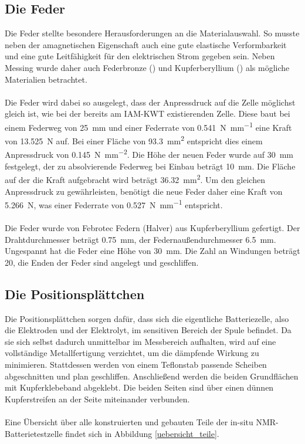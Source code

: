 \documentclass[a4paper, 11pt, headsepline,footsepline,twoside,abstract]{scrbook}
\begin{document}
\subsection{Die Feder}
Die Feder stellte besondere Herausforderungen an die Materialauswahl. So musste neben der amagnetischen Eigenschaft auch eine gute elastische Verformbarkeit und eine gute Leitfähigkeit für den elektrischen Strom gegeben sein. Neben Messing wurde daher auch Federbronze () und Kupferberyllium () als mögliche Materialien betrachtet.
\\\\
Die Feder wird dabei so ausgelegt, dass der Anpressdruck auf die Zelle möglichst gleich ist, wie bei der bereits am IAM-KWT existierenden Zelle. Diese baut bei einem Federweg von \SI{25}{\milli\metre} und einer Federrate von \SI{0.541}{\newton\per\milli\metre} eine Kraft von \SI{13.525}{\newton} auf. Bei einer Fläche von \SI{93.3}{\square\milli\metre} entspricht dies einem Anpressdruck von \SI{0.145}{\newton\per\square\milli\metre}. Die Höhe der neuen Feder wurde auf \SI{30}{\milli\metre} festgelegt, der zu absolvierende Federweg bei Einbau beträgt \SI{10}{\milli\metre}. Die Fläche auf der die Kraft aufgebracht wird beträgt \SI{36.32}{\square\milli\metre}. Um den gleichen Anpressdruck zu gewährleisten, benötigt die neue Feder daher eine Kraft von \SI{5.266}{\newton}, was einer Federrate von \SI{0.527}{\newton\per\milli\metre} entspricht.
\\\\
Die Feder wurde von Febrotec Federn (Halver) aus Kupferberyllium gefertigt. Der Drahtdurchmesser beträgt \SI{0.75}{\milli\metre}, der Federnaußendurchmesser \SI{6.5}{\milli\metre}. Ungespannt hat die Feder eine Höhe von \SI{30}{\milli\metre}. Die Zahl an Windungen beträgt 20, die Enden der Feder sind angelegt und geschliffen. %
\subsection{Die Positionsplättchen}
Die Positionsplättchen sorgen dafür, dass sich die eigentliche Batteriezelle, also die Elektroden und der Elektrolyt, im sensitiven Bereich der Spule befindet. Da sie sich selbst dadurch unmittelbar im Messbereich aufhalten, wird auf eine vollständige Metallfertigung verzichtet, um die dämpfende Wirkung zu minimieren. Stattdessen werden von einem Teflonstab passende Scheiben abgeschnitten und plan geschliffen. Anschließend werden die beiden Grundflächen mit Kupferklebeband abgeklebt. Die beiden Seiten sind über einen dünnen Kupferstreifen an der Seite miteinander verbunden. 
\\\\
Eine Übersicht über alle konstruierten und gebauten Teile der in-situ NMR-Batterietestzelle findet sich in Abbildung \ref{uebersicht_teile}.
\end{document}
